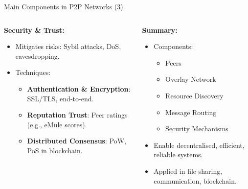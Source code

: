 \documentclass[aspectratio=169, table]{beamer}
\begin{document}
\begin{frame}{Main Components in P2P Networks (3)}
	\vspace{20pt}
	\begin{columns}[t]
		
		\begin{column}{0.5\textwidth}
			\textbf{Security \& Trust:}
			\begin{itemize}
				\item Mitigates risks: Sybil attacks, DoS, eavesdropping.
				\item Techniques:
				\begin{itemize}
					\item \textbf{Authentication \& Encryption}: SSL/TLS, end-to-end.
					\item \textbf{Reputation Trust}: Peer ratings (e.g., eMule scores).
					\item \textbf{Distributed Consensus}: PoW, PoS in blockchain.
				\end{itemize}
			\end{itemize}
		\end{column}
		
		\begin{column}{0.5\textwidth}
			\textbf{Summary:}
			\begin{itemize}
				\item Components:
				\begin{itemize}
					\item Peers
					\item Overlay Network
					\item Resource Discovery
					\item Message Routing
					\item Security Mechanisms
				\end{itemize}
				\item Enable decentralised, efficient, reliable systems.
				\item Applied in file sharing, communication, blockchain.
			\end{itemize}
		\end{column}
		
	\end{columns}
\end{frame}
\end{document}
